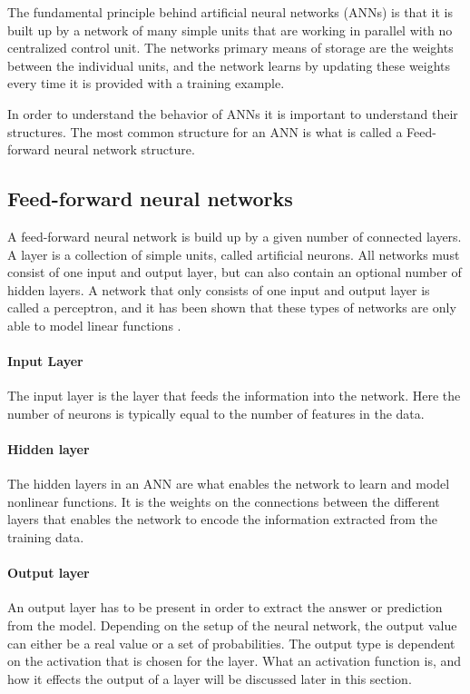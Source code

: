 The fundamental principle behind artificial neural networks (ANNs) is that it is built up by a network of many simple units that are working in parallel with no centralized control unit. The networks primary means of storage are the weights between the individual units, and the network learns by updating these weights every time it is provided with a training example.

In order to understand the behavior of ANNs it is important to understand their structures. The most common structure for an ANN is what is called a Feed-forward neural network structure.

\subsection{Feed-forward neural networks}
A feed-forward neural network is build up by a given number of connected layers. A layer is a collection of simple units, called artificial neurons. All networks must consist of one input and output layer, but can also contain an optional number of hidden layers. A network that only consists of one input and output layer is called a perceptron, and it has been shown that these types of networks are only able to model linear functions \citep{Minsky1969}.

\paragraph{Input Layer}
The input layer is the layer that feeds the information into the network. Here the number of neurons is typically equal to the number of features in the data.

\paragraph{Hidden layer}
The hidden layers in an ANN are what enables the network to learn and model nonlinear functions. It is the weights on the connections between the different layers that enables the network to encode the information extracted from the training data.

\paragraph{Output layer}
An output layer has to be present in order to extract the answer or prediction from the model. Depending on the setup of the neural network, the output value can either be a real value or a set of probabilities. The output type is dependent on the activation that is chosen for the layer. What an activation function is, and how it effects the output of a layer will be discussed later in this section.

